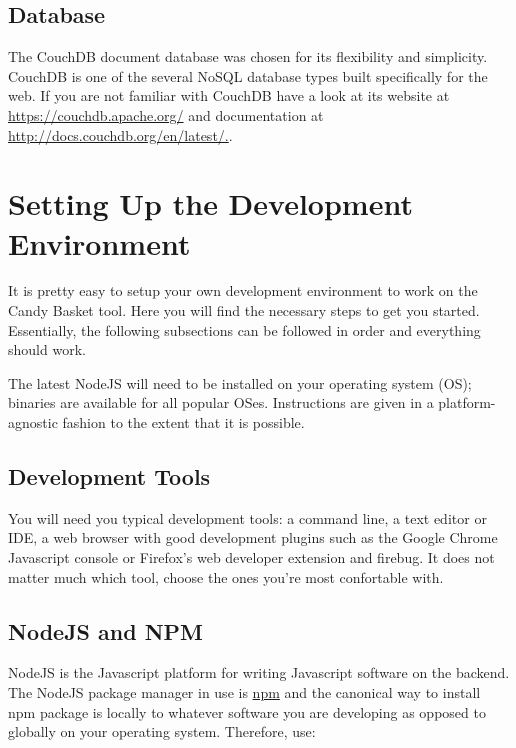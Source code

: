 \documentclass[letterpaper,10pt,english]{sphinxmanual}
\begin{document}
\subsection{Database}
\label{developer-guide:database}
The CouchDB document database was chosen for its flexibility and
simplicity. CouchDB is one of the several NoSQL database types built
specifically for the web. If you are not familiar with CouchDB have a
look at its website at \href{https://couchdb.apache.org/}{https://couchdb.apache.org/} and documentation at
\href{http://docs.couchdb.org/en/latest/}{http://docs.couchdb.org/en/latest/.}.


\section{Setting Up the Development Environment}
\label{developer-guide:setting-up-the-development-environment}
It is pretty easy to setup your own development environment to work on
the Candy Basket tool. Here you will find the necessary steps to get
you started. Essentially, the following subsections can be followed in
order and everything should work.

The latest NodeJS will need to be installed on your operating system
(OS); binaries are available for all popular OSes. Instructions are
given in a platform-agnostic fashion to the extent that it is
possible.


\subsection{Development Tools}
\label{developer-guide:development-tools}
You will need you typical development tools: a command line, a text
editor or IDE, a web browser with good development plugins such as the
Google Chrome Javascript console or Firefox's web developer extension
and firebug. It does not matter much which tool, choose the ones
you're most confortable with.


\subsection{NodeJS and NPM}
\label{developer-guide:nodejs-npm}\label{developer-guide:nodejs-and-npm}
NodeJS is the Javascript platform for writing Javascript software on
the backend. The NodeJS package manager in use is \href{https://www.npmjs.org/}{npm} and the canonical way to install npm
package is locally to whatever software you are developing as opposed
to globally on your operating system. Therefore, use:
\end{document}
